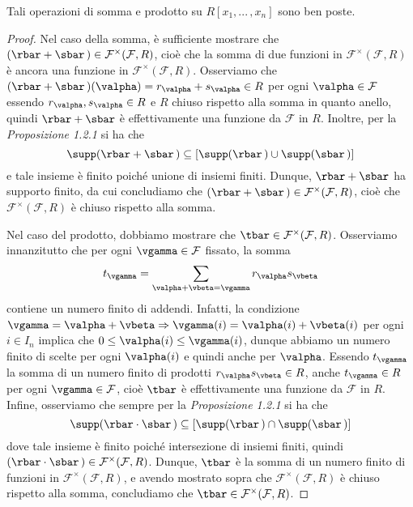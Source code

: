\begin{prop}[1.2.2]{} 
Tali operazioni di somma e prodotto su $R[x_1,...\,,x_n]$ sono ben poste.
\end{prop}
\vspace{-4mm}
\begin{proof}
Nel caso della somma, è sufficiente mostrare che $(\rbar + \sbar\,) \in \mathcal{F}^{\times}(\mathcal{F},R)$, cioè che la somma di due funzioni in $\mathcal{F}^{\times}(\mathcal{F},R)$ è ancora una funzione in $\mathcal{F}^{\times}(\mathcal{F},R)$. Osserviamo che $(\rbar + \sbar\,)(\valpha)=r_{\valpha}+s_{\valpha}\in R$ per ogni $\valpha\in \mathcal{F}$ essendo $r_{\valpha}, s_{\valpha}\in R$ e $R$ chiuso rispetto alla somma in quanto anello, quindi $\rbar + \sbar$ è effettivamente una funzione da $\mathcal{F}$ in $R$. Inoltre, per la \emph{Proposizione 1.2.1} si ha che $$\supp(\rbar+\sbar\,)\subseteq [\supp(\rbar\,) \cup \supp(\sbar\,)]$$ e tale insieme è finito poiché unione di insiemi finiti. Dunque, $\rbar + \sbar$ ha supporto finito, da cui concludiamo che $(\rbar + \sbar\,) \in \mathcal{F}^{\times}(\mathcal{F},R)$, cioè che $\mathcal{F}^{\times}(\mathcal{F},R)$ è chiuso rispetto alla somma.

\vspace{1.5mm}

\noindent Nel caso del prodotto, dobbiamo mostrare che $\tbar\in \mathcal{F}^{\times}(\mathcal{F},R)$. Osserviamo innanzitutto che per ogni $\vgamma\in \mathcal{F}$ fissato, la somma $$t_{\vgamma} = \sum\limits_{\valpha+\vbeta=\vgamma} r_{\valpha}s_{\vbeta}$$ contiene un numero finito di addendi. Infatti, la condizione $\vgamma=\valpha+\vbeta\Rightarrow \vgamma(i)=\valpha(i)+\vbeta(i)$ per ogni $i\in I_n$ implica che $0\leq \valpha(i) \leq \vgamma(i)$, dunque abbiamo un numero finito di scelte per ogni $\valpha(i)$ e quindi anche per $\valpha$. Essendo $t_{\vgamma}$ la somma di un numero finito di prodotti $r_{\valpha}s_{\vbeta}\in R$, anche $t_{\vgamma}\in R$ per ogni $\vgamma\in \mathcal{F}$, cioè $\tbar$ è effettivamente una funzione da $\mathcal{F}$ in $R$. Infine, osserviamo che sempre per la \emph{Proposizione 1.2.1} si ha che $$\supp(\rbar\cdot \sbar\,)\subseteq [\supp(\rbar\,) \cap \supp(\sbar\,)]$$ dove tale insieme è finito poiché intersezione di insiemi finiti, quindi $(\rbar\cdot \sbar\,) \in \mathcal{F}^{\times}(\mathcal{F},R)$. Dunque, $\tbar$ è la somma di un numero finito di funzioni in $\mathcal{F}^{\times}(\mathcal{F},R)$, e avendo mostrato sopra che $\mathcal{F}^{\times}(\mathcal{F},R)$ è chiuso rispetto alla somma, concludiamo che $\tbar\in \mathcal{F}^{\times}(\mathcal{F},R)$.
\end{proof}

